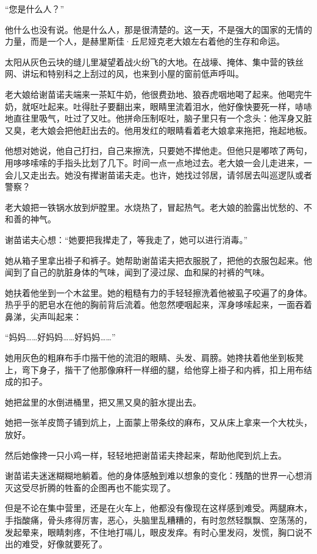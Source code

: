 “您是什么人？”

他什么也没有说。他是什么人，那是很清楚的。这一天，不是强大的国家的无情的力量，而是一个人，是赫里斯佳·丘尼娅克老大娘左右着他的生存和命运。

太阳从灰色云块的缝儿里凝望着战火纷飞的大地。在战壕、掩体、集中营的铁丝网、讲坛和特别科之上刮过的风，也来到小屋的窗前低声呼叫。

老大娘给谢苗诺夫端来一茶缸牛奶，他很费劲地、狼吞虎咽地喝了起来。他喝完牛奶，就呕吐起来。吐得肚子要翻出来，眼睛里流着泪水，他好像快要死一样，哧哧地直往里吸气，吐过了又吐。他拼命压制呕吐，脑子里只有一个念头：他浑身又脏又臭，老大娘会把他赶出去的。他用发红的眼睛看着老大娘拿来拖把，拖起地板。

他想对她说，他自己打扫，自己来擦洗，只要她不撵他走。但他只是嘟哝了两句，用哆哆嗦嗦的手指头比划了几下。时间一点一点地过去。老大娘一会儿走进来，一会儿又走出去。她没有撵谢苗诺夫走。也许，她找过邻居，请邻居去叫巡逻队或者警察？

老大娘把一铁锅水放到炉膛里。水烧热了，冒起热气。老大娘的脸露出忧愁的、不和善的神气。

谢苗诺夫心想：“她要把我撵走了，等我走了，她可以进行消毒。”

她从箱子里拿出褂子和裤子。她帮助谢苗诺夫把衣服脱了，把他的衣服包起来。他闻到了自己的肮脏身体的气味，闻到了浸过尿、血和屎的衬裤的气味。

她扶着他坐到一个木盆里。她的粗糙有力的手轻轻擦洗着他被虱子咬遍了的身体。热乎乎的肥皂水在他的胸前背后流着。他忽然哽咽起来，浑身哆嗦起来，一面吞着鼻涕，尖声叫起来：

“妈妈……好妈妈……好妈妈……”

她用灰色的粗麻布手巾揩干他的流泪的眼睛、头发、肩膀。她搀扶着他坐到板凳上，弯下身子，揩干了他那像麻秆一样细的腿，给他穿上褂子和内裤，扣上用布结成的扣子。

她把盆里的水倒进桶里，把又黑又臭的脏水提出去。

她把一张羊皮筒子铺到炕上，上面蒙上带条纹的麻布，又从床上拿来一个大枕头，放好。

然后她像搀一只小鸡一样，轻轻地把谢苗诺夫搀起来，帮助他爬到炕上去。

谢苗诺夫迷迷糊糊地躺着。他的身体感触到难以想象的变化：残酷的世界一心想消灭这受尽折腾的牲畜的企图再也不能实现了。

但是不论在集中营里，还是在火车上，他都没有像现在这样感到难受。两腿麻木，手指酸痛，骨头疼得厉害，恶心，头脑里乱糟糟的，有时忽然轻飘飘、空荡荡的，发起晕来，眼睛刺疼，不住地打嗝儿，眼皮发痒。有时心里发闷，发慌，胸口说不出的难受，好像就要死了。

